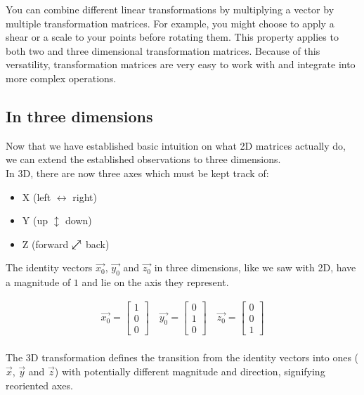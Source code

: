 \documentclass[12pt, a4paper]{article}
\newcommand{\neswarrow}{\ensurestackMath{\stackengine{0pt}{\nearrow}{\swarrow}{O}{c}{F}{F}{L}}}
\begin{document}
You can combine different linear transformations by multiplying a vector by
multiple transformation matrices. For example, you might choose to apply a shear
or a scale to your points before rotating them. This property applies to both
two and three dimensional transformation matrices. Because of this versatility, transformation matrices
are very easy to work with and integrate into more complex operations.

\subsection{In three dimensions}

Now that we have established basic intuition on what 2D matrices actually do, we
can extend the established observations to three dimensions. \\

In 3D, there are now three axes which must be kept track of:
\begin{itemize}[leftmargin=2cm]
    \item X (left $\leftrightarrow$ right)
    \item Y (up $\updownarrow$ down)
    \item Z (forward $\neswarrow$ back)
\end{itemize}

The identity vectors $\vec{x_0}$, $\vec{y_0}$ and $\vec{z_0}$ in three
dimensions, like we saw with 2D, have a magnitude of $1$ and lie on the axis
they represent.

\begin{align*}
    \vec{x_0} = \begin{bmatrix} 1 \\ 0 \\ 0 \end{bmatrix}
    \quad
    \vec{y_0} = \begin{bmatrix} 0 \\ 1 \\ 0 \end{bmatrix}
    \quad
    \vec{z_0} = \begin{bmatrix} 0 \\ 0 \\ 1 \end{bmatrix}
\end{align*} \\

The 3D transformation defines the transition from the identity vectors into ones
($\vec{x}$, $\vec{y}$ and $\vec{z}$) with potentially different magnitude and
direction, signifying reoriented axes.
\end{document}
